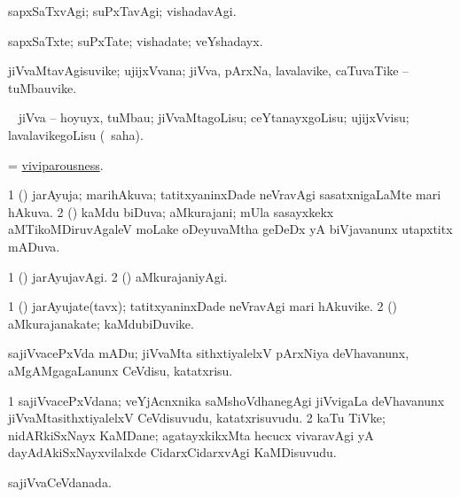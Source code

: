 \bentry 
{} 
\gl{\kirxvi}
\expl{}
\bmng
 sapxSaTxvAgi; suPxTavAgi; vishadavAgi. 
\emng
\eentry

\bentry 
{} 
\gl{\nA}
\expl{}
\bmng
 sapxSaTxte; suPxTate; vishadate; veYshadayx. 
\emng
\eentry

\bentry
{} 
\gl{\nA}
\expl{}
\bmng
 jiVvaMtavAgisuvike; ujijxVvana; jiVva, pArxNa, lavalavike, caTuvaTike -- tuMbauvike. 
\emng
\eentry

\bentry
{} 
\gl{\akirx}
\BUkaq\  \bmng
 jiVva -- hoyuyx, tuMbau; jiVvaMtagoLisu; ceYtanayxgoLisu; ujijxVvisu; lavalavikegoLisu (\rUpa\ saha). 
\emng
\eentry

\bentry 
{} 
\gl{\nA}
\expl{}
\bmng
 = \hyperlink{viviparousness}{viviparousness}. 
\emng
\eentry

\bentry 
{} 
\gl{\gu}
\expl{}
\bmng
\bnum
\num{1} (\pArxvi) jarAyuja; marihAkuva; tatitxyaninxDade neVravAgi sasatxnigaLaMte mari hAkuva. 
\num{2} (\savi) kaMdu biDuva; aMkurajani; mUla sasayxkekx aMTikoMDiruvAgaleV moLake oDeyuvaMtha geDeDx yA biVjavanunx utapxtitx mADuva. 
\enum
\emng
\eentry

\bentry 
{} 
\gl{\kirxvi}
\expl{}
\bmng
\bnum
\num{1} (\pArxvi) jarAyujavAgi. 
\num{2} (\savi) aMkurajaniyAgi. 
\enum
\emng
\eentry

\bentry
{} 
\gl{\nA}
\expl{}
\bmng
\bnum
\num{1} (\pArxvi) jarAyujate(tavx); tatitxyaninxDade neVravAgi mari hAkuvike. 
\num{2} (\savi) aMkurajanakate; kaMdubiDuvike. 
\enum
\emng
\eentry

\bentry
{} 
\gl{\akirx}
\expl{}
\bmng
 sajiVvacePxVda mADu; jiVvaMta sithxtiyalelxV pArxNiya deVhavanunx, aMgAMgagaLanunx CeVdisu, katatxrisu. 
\emng
\eentry

\bentry 
{} 
\gl{\nA}
\expl{}
\bmng
\bnum
\num{1} sajiVvacePxVdana; veYjAcnxnika saMshoVdhanegAgi jiVvigaLa deVhavanunx jiVvaMtasithxtiyalelxV CeVdisuvudu, katatxrisuvudu. 
\num{2} kaTu TiVke; nidARkiSxNayx KaMDane; agatayxkikxMta hecucx vivaravAgi yA dayAdAkiSxNayxvilalxde CidarxCidarxvAgi KaMDisuvudu. 
\enum
\emng
\eentry

\bentry 
{} 
\gl{\gu}
\expl{}
\bmng
 sajiVvaCeVdanada. 
\emng
\eentry

